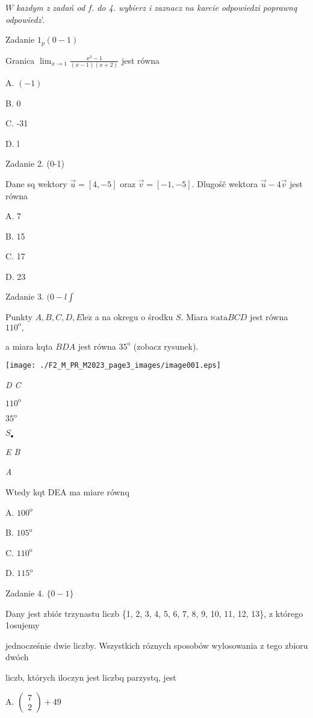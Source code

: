 \documentclass[a4paper,12pt]{article}
\begin{document}
$W$ {\it kazdym z zadań od} $f.$ {\it do 4. wybierz i zaznacz na karcie odpowiedzi poprawnq odpowiedz}'.

Zadanie $1_{p}(0-1)$

Granica $\displaystyle \lim_{x\rightarrow 1}\frac{x^{3}-1}{(x-1)(x+2)}$ jest równa

A. $(-1)$

B. 0

C. -31

D. l

Zadanie 2. (0-1)

Dane sq wektory $\vec{u}=[4,-5]$ oraz $\vec{v}=[-1,-5]$. Dlugośč wektora $\vec{u}-4\vec{v}$ jest równa

A. 7

B. 15

C. 17

D. 23

Zadanie 3. $(0-l\displaystyle \int$

Punkty $A, B, C, D, E \mathrm{l}\mathrm{e}\dot{\mathrm{z}}$ a na okregu o środku $S$. Miara $\ltimes \mathrm{a}\mathrm{t}\mathrm{a} BCD$ jest równa $110^{\mathrm{o}},$

a miara kqta $BDA$ jest równa $35^{\mathrm{o}}$ (zobacz rysunek).
\begin{center}
\texttt{[image: ./F2\_M\_PR\_M2023\_page3\_images/image001.eps]}
\end{center}
{\it D  C}

$110^{\mathrm{o}}$

$35^{\mathrm{o}}$

$S_{\bullet}$

{\it E  B}

{\it A}

Wtedy kqt DEA ma miare równq

A. $100^{\mathrm{o}}$

B. $105^{\mathrm{o}}$

C. $110^{\mathrm{o}}$

D. $115^{\mathrm{o}}$

Zadanie 4. $\{0-1\}$

Dany jest zbiór trzynastu liczb \{1, 2, 3, 4, 5, 6, 7, 8, 9, 10, 11, 12, 13\}, z którego 1osujemy

jednocześnie dwie liczby. Wszystkich róznych sposobów wylosowania z tego zbioru dwóch

liczb, których iloczyn jest liczbq parzystq, jest

A. $\left(\begin{array}{l}
7\\
2
\end{array}\right)+49$
\end{document}
